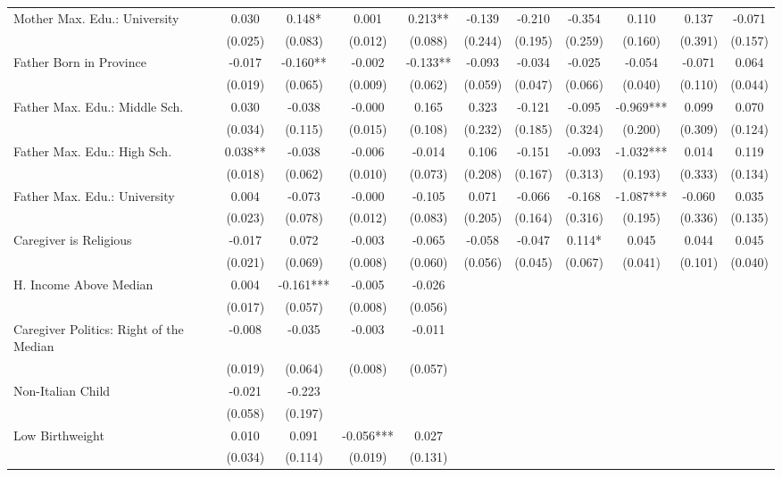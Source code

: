 \begin{tabular}{lcccccccccc}
Mother Max. Edu.: University & 0.030 & 0.148* & 0.001 & 0.213** & -0.139 & -0.210 & -0.354 & 0.110 & 0.137 & -0.071 \\
 & (0.025) & (0.083) & (0.012) & (0.088) & (0.244) & (0.195) & (0.259) & (0.160) & (0.391) & (0.157) \\
Father Born in Province & -0.017 & -0.160** & -0.002 & -0.133** & -0.093 & -0.034 & -0.025 & -0.054 & -0.071 & 0.064 \\
 & (0.019) & (0.065) & (0.009) & (0.062) & (0.059) & (0.047) & (0.066) & (0.040) & (0.110) & (0.044) \\
Father Max. Edu.: Middle Sch. & 0.030 & -0.038 & -0.000 & 0.165 & 0.323 & -0.121 & -0.095 & -0.969*** & 0.099 & 0.070 \\
 & (0.034) & (0.115) & (0.015) & (0.108) & (0.232) & (0.185) & (0.324) & (0.200) & (0.309) & (0.124) \\
Father Max. Edu.: High Sch. & 0.038** & -0.038 & -0.006 & -0.014 & 0.106 & -0.151 & -0.093 & -1.032*** & 0.014 & 0.119 \\
 & (0.018) & (0.062) & (0.010) & (0.073) & (0.208) & (0.167) & (0.313) & (0.193) & (0.333) & (0.134) \\
Father Max. Edu.: University & 0.004 & -0.073 & -0.000 & -0.105 & 0.071 & -0.066 & -0.168 & -1.087*** & -0.060 & 0.035 \\
 & (0.023) & (0.078) & (0.012) & (0.083) & (0.205) & (0.164) & (0.316) & (0.195) & (0.336) & (0.135) \\
Caregiver is Religious & -0.017 & 0.072 & -0.003 & -0.065 & -0.058 & -0.047 & 0.114* & 0.045 & 0.044 & 0.045 \\
 & (0.021) & (0.069) & (0.008) & (0.060) & (0.056) & (0.045) & (0.067) & (0.041) & (0.101) & (0.040) \\
H. Income Above Median & 0.004 & -0.161*** & -0.005 & -0.026 &  &  &  &  &  &  \\
 & (0.017) & (0.057) & (0.008) & (0.056) &  &  &  &  &  &  \\
Caregiver Politics: Right of the Median & -0.008 & -0.035 & -0.003 & -0.011 &  &  &  &  &  &  \\
 & (0.019) & (0.064) & (0.008) & (0.057) &  &  &  &  &  &  \\
Non-Italian Child & -0.021 & -0.223 &  &  &  &  &  &  &  &  \\
 & (0.058) & (0.197) &  &  &  &  &  &  &  &  \\
Low Birthweight & 0.010 & 0.091 & -0.056*** & 0.027 &  &  &  &  &  &  \\
 & (0.034) & (0.114) & (0.019) & (0.131) &  &  &  &  &  &  \\

\end{tabular}
